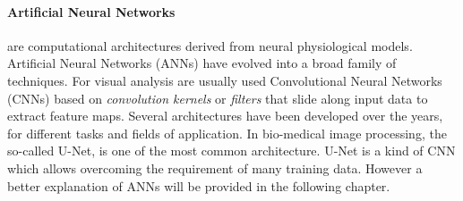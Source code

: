 \documentclass{standalone}
\begin{document}
\paragraph{Artificial Neural Networks} 
are computational architectures derived from neural physiological models\cite{segmentationreview}.
Artificial Neural Networks (ANNs) have evolved into a broad family of techniques.
For visual analysis are usually used Convolutional Neural Networks (CNNs) based on \textit{convolution kernels} or \textit{filters} that slide along input data to extract feature maps\cite{wiki:cnn}.
Several architectures have been developed over the years, for different tasks and fields of application.
In bio-medical image processing, the so-called U-Net\cite{unet}, is one of the most common architecture.
U-Net is a kind of CNN which allows overcoming the requirement of many training data\cite{biondi, unet}.
However a better explanation of ANNs will be provided in the following chapter.
\end{document}
